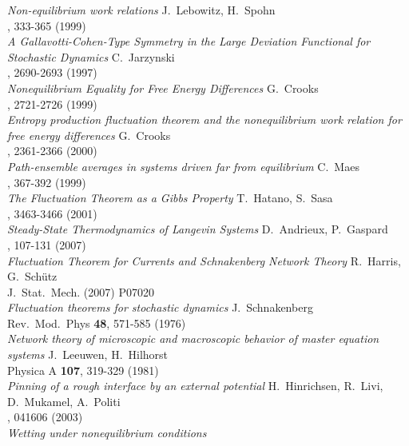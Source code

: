 \begin{thebibliography}{99}
{		\emph{Non-equilibrium work relations}
		}
	 {
		J.~Lebowitz, H.~Spohn \\
		, 333-365 (1999) \\
		\emph{A Gallavotti-Cohen-Type Symmetry in the Large Deviation Functional for Stochastic Dynamics}
		}
	 {
		C.~Jarzynski \\
		, 2690-2693 (1997) \\
		\emph{Nonequilibrium Equality for Free Energy Differences}
		}
	 {
		G.~Crooks \\
		, 2721-2726 (1999) \\
		\emph{Entropy production fluctuation theorem and the nonequilibrium work relation for free energy differences}
		}
	 {
		G.~Crooks \\
		, 2361-2366 (2000)  \\
		\emph{Path-ensemble averages in systems driven far from equilibrium}
		}
	 {
		C.~Maes \\
		, 367-392 (1999) \\
		\emph{The Fluctuation Theorem as a Gibbs Property}
		}
	 {
		T.~Hatano, S.~Sasa \\
		, 3463-3466 (2001) \\
		\emph{Steady-State Thermodynamics of Langevin Systems}
		}
	 {
		D.~Andrieux, P.~Gaspard \\
		, 107-131 (2007) \\
		\emph{Fluctuation Theorem for Currents and Schnakenberg Network Theory}
		}
	 {
		R.~Harris, G.~Sch\"utz \\
		J.~Stat.~Mech. (2007) P07020 \\
		\emph{Fluctuation theorems for stochastic dynamics}
		}
	 {
		J.~Schnakenberg \\
		Rev.~Mod.~Phys \textbf{48}, 571-585 (1976) \\
		\emph{Network theory of microscopic and macroscopic behavior of master equation systems}
		}
	 {
		J.~Leeuwen, H.~Hilhorst \\
		Physica A \textbf{107}, 319-329 (1981) \\
		\emph{Pinning of a rough interface by an external potential}
		}
	 {
		H.~Hinrichsen, R.~Livi, D.~Mukamel, A.~Politi \\
		, 041606 (2003) \\
		\emph{Wetting under nonequilibrium conditions}
		}



\end{thebibliography}
